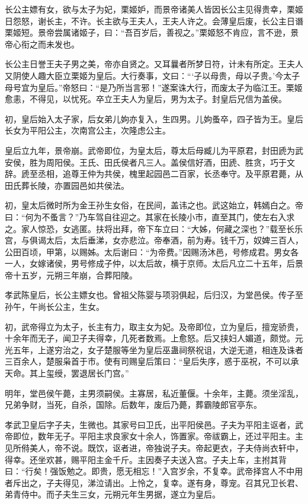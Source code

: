 \documentclass[12pt,UTF8]{ctexbook}
\begin{document}
长公主嫖有女，欲与太子为妃，栗姬妒，而景帝诸美人皆因长公主见得贵幸，栗姬日怨怒，谢长主，不许。长主欲与王夫人，王夫人许之。会薄皇后废，长公主日谮栗姬短。景帝尝属诸姬子，曰：“吾百岁后，善视之。”栗姬怒不肯应，言不逊，景帝心衔之而未发也。



长公主日誉王夫子男之美，帝亦自贤之。又耳曩者所梦日符，计未有所定。王夫人又阴使人趣大臣立栗姬为皇后。大行奏事，文曰：“‘子以母贵，母以子贵。’今太子母号宜为皇后。”帝怒曰：“是乃所当言邪！”遂案诛大行，而废太子为临江王。栗姬愈恚，不得见，以忧死。卒立王夫人为皇后，男为太子。封皇后兄信为盖侯。



初，皇后始入太子家，后女弟儿姁亦复入，生四男。儿姁蚤卒，四子皆为王。皇后长女为平阳公主，次南宫公主，次隆虑公主。



皇后立九年，景帝崩。武帝即位，为皇太后，尊太后母臧儿为平原君，封田虒为武安侯，胜为周阳侯。王氏、田氏侯者凡三人。盖侯信好酒，田虒、胜贪，巧于文辞。虒至丞相，追尊王仲为共侯，槐里起园邑二百家，长丞奉守。及平原君薨，从田氏葬长陵，亦置园邑如共侯法。



初，皇太后微时所为金王孙生女俗，在民间，盖讳之也。武这始立，韩嫣白之。帝曰：“何为不蚤言？”乃车驾自往迎之。其家在长陵小市，直至其门，使左右入求之。家人惊恐，女逃匿。扶将出拜，帝下车立曰：“大姊，何藏之深也？”载至长乐宫，与俱谒太后，太后垂涕，女亦悲泣。帝奉酒，前为寿。钱千万，奴婢三百人，公田百顷，甲第，以赐姊。太后谢曰：“为帝费。”因赐汤沐邑，号修成君。男女各一人，女嫁诸侯，男号修成子仲，以太后故，横于京师。太后凡立二十五年，后景帝十五岁，元朔三年崩，合葬阳陵。



孝武陈皇后，长公主嫖女也。曾祖父陈婴与项羽俱起，后归汉，为堂邑侯。传子至孙午，午尚长公主，生女。



初，武帝得立为太子，长主有力，取主女为妃。及帝即位，立为皇后，擅宠骄贵，十余年而无子，闻卫子夫得幸，几死者数焉。上愈怒。后又挟妇人媚道，颇觉。元光五年，上遂穷治之，女子楚服等坐为皇后巫蛊祠祭祝诅，大逆无道，相连及诛者三百余人，楚服枭首于市。使有司赐皇后策曰：“皇后失序，惑于巫祝，不可以承天命。其上玺绶，罢退居长门宫。”



明年，堂邑侯午薨，主男须嗣侯。主寡居，私近董偃。十余年，主薨。须坐淫乱，兄弟争财，当死，自杀，国除。后数年，废后乃薨，葬霸陵郎官亭东。



孝武卫皇后字子夫，生微也。其家号曰卫氏，出平阳侯邑。子夫为平阳主讴者，武帝即位，数年无子。平阳主求良家女十余人，饰置家。帝祓霸上，还过平阳主。主见所偫美人，帝不说。既饮，讴者进，帝独说子夫。帝起更衣，子夫侍尚衣轩中，得幸。还坐欢甚，赐平阳主金千斤。主因奏子夫送入宫。子夫上车，主拊其背曰：“行矣！强饭勉之。即贵，愿无相忘！”入宫岁余，不复幸。武帝择宫人不中用者斥出之，子夫得见，涕泣请出。上怜之，复幸。遂有身，尊宠。召其兄卫长君、弟青侍中。而子夫生三女，元朔元年生男据，遂立为皇后。
\end{document}
